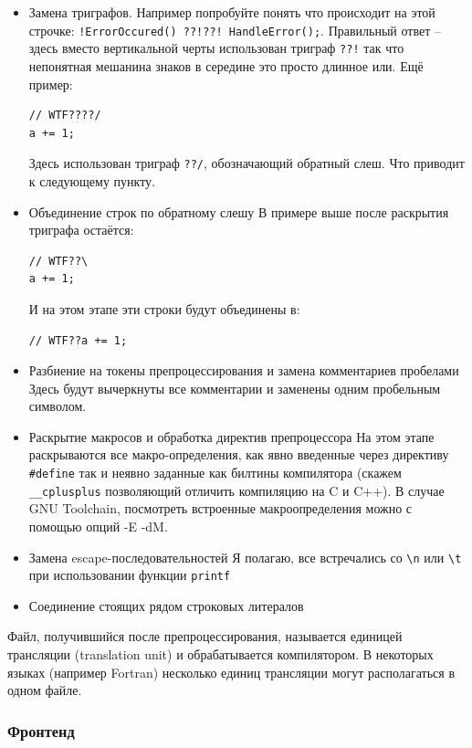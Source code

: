 \documentclass[a4paper,12pt,oneside]{article}
\begin{document}
\begin{itemize}
\item Замена триграфов.
Например попробуйте понять что происходит на этой строчке: \lstinline$!ErrorOccured() ??!??! HandleError();$. Правильный ответ -- здесь вместо вертикальной черты использован триграф \lstinline$??!$ так что непонятная мешанина знаков в середине это просто длинное или. Ещё пример: 

\begin{lstlisting}
// WTF????/
a += 1;
\end{lstlisting}

Здесь использован триграф \lstinline$??/$, обозначающий обратный слеш. Что приводит к следующему пункту.
\item Объединение строк по обратному слешу
В примере выше после раскрытия триграфа остаётся:
\begin{lstlisting}
// WTF??\
a += 1;
\end{lstlisting}
И на этом этапе эти строки будут объединены в:
\begin{lstlisting}
// WTF??a += 1;
\end{lstlisting}
\item Разбиение на токены препроцессирования и замена комментариев пробелами
Здесь будут вычеркнуты все комментарии и заменены одним пробельным символом.
\item Раскрытие макросов и обработка директив препроцессора
На этом этапе раскрываются все макро-определения, как явно введенные через директиву \lstinline!#define! так и неявно заданные как билтины компилятора (скажем \lstinline!__cplusplus! позволяющий отличить компиляцию на C и C++). В случае GNU Toolchain, посмотреть встроенные макроопределения можно с помощью опций -E -dM.
\item Замена escape-последовательностей
Я полагаю, все встречались со \lstinline!\n! или \lstinline!\t! при использовании функции \lstinline!printf!
\item Соединение стоящих рядом строковых литералов
\end{itemize}

Файл, получившийся после препроцессирования, называется единицей трансляции (translation unit) и обрабатывается компилятором. В некоторых языках (например Fortran) несколько единиц трансляции могут располагаться в одном файле.

\subsubsection{Фронтенд}
\end{document}
